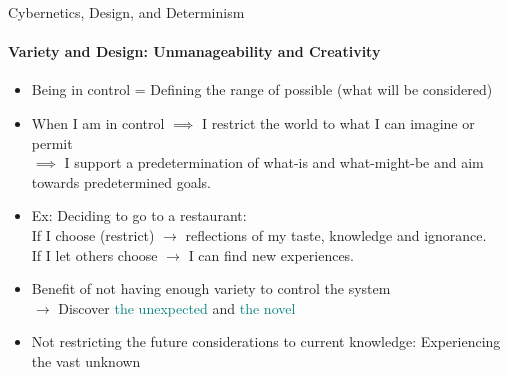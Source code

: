 \documentclass[
	11pt,
	aspectratio=169,
]{beamer}
\begin{document}
            \begin{frame}{Cybernetics, Design, and Determinism}
            \framesubtitle{Variety and Design: Unmanageability and Creativity}
    		    \begin{itemize}
    		        \item<1-> Being in control = Defining the range of possible (what will be considered)
    		        \item<2-> When I am in control $\implies$ I restrict the world to what I can imagine or permit\\
    		            $\implies$ I support a predetermination of what-is and what-might-be and aim towards predetermined goals.
		            \item<3-> Ex: Deciding to go to a restaurant:\\
		                    If I choose (restrict) $\longrightarrow$ reflections of my taste, knowledge and ignorance.\\
		                    If I let others choose $\longrightarrow$ I can find new experiences.
                    \item<4-> Benefit of not having enough variety to control the system\\
                    $\longrightarrow$ Discover \textcolor{teal}{the unexpected} and \textcolor{teal}{the novel}
                    \item<5-> Not restricting the future considerations to current knowledge: Experiencing the vast unknown
    		    \end{itemize}
            \end{frame}
\end{document}
